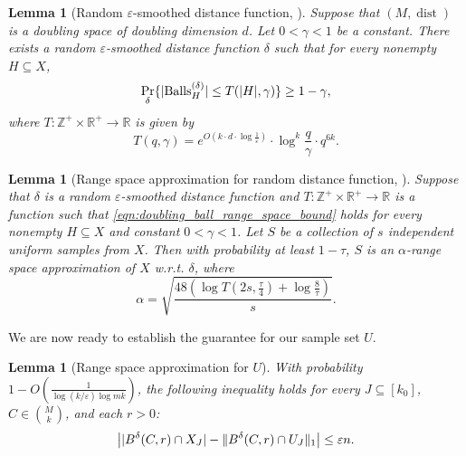 \documentclass[11pt,letterpaper]{article}
\newtheorem{lemma}[theorem]{Lemma}
\theoremstyle{definition}
\newcommand{\eps}{\varepsilon}
\newcommand{\R}{\mathbb{R}}
\newcommand{\Z}{\mathbb{Z}}
\DeclareMathOperator{\dist}{dist}
\DeclarePairedDelimiter{\abs}{\lvert}{\rvert}
\DeclarePairedDelimiter{\norm}{\lVert}{\rVert}
\begin{document}
\begin{lemma}[Random $\eps$-smoothed distance function, {\cite[Eq.(10)]{huang2018epsilon}}] \label{lemma:randomdist}
    Suppose that $(M,\dist)$ is a doubling space of doubling dimension $d$. Let $0<\gamma<1$ be a constant. There exists a random $\eps$-smoothed distance function $\delta$ such that for every nonempty $H\subseteq X$, 
    \begin{equation}\label{eqn:doubling_ball_range_space_bound}
        \Pr_\delta \{ \abs{\Ballsh[\delta]}\leq T(\abs{H},\gamma) \}\geq 1-\gamma,
    \end{equation}
    where $T:\Z^+\times \R^+ \rightarrow \mathbb{R}$ is given by
    \begin{equation}\label{eqn:doubling_T}
       T(q,\gamma) = e^{O(k\cdot d\cdot \log\frac{1}{\eps})}\cdot \log^k{\frac{q}{\gamma}}\cdot q^{6k}.
    \end{equation}
\end{lemma}

\begin{lemma} [Range space approximation for random distance function, {\cite[Lemma 3.1]{huang2018epsilon}}] \label{lemma:randomapprox}
    Suppose that $\delta$ is a random $\eps$-smoothed distance function and $T:\Z^+ \times \R^+\to \R$ is a function such that \eqref{eqn:doubling_ball_range_space_bound} holds 
    for every nonempty $H\subseteq X$ and constant $0<\gamma<1$.
    Let $S$ be a collection of $s$ independent uniform samples from $X$. Then with probability at least $1-\tau$, $S$ is an $\alpha$-range space approximation of $X$ w.r.t. $\delta$, where
    \begin{equation}\label{eqn:doubling_range_space_alpha}
        \alpha = \sqrt{\frac{48( \log{T(2s,\frac{\tau}{4})} +\log{\frac{8}{\tau}})}{s}}.
    \end{equation}
\end{lemma}

We are now ready to establish the guarantee for our sample set $U$.
\begin{lemma} [Range space approximation for $U$]
\label{lemma:eps_range}
    With probability $1 - O(\frac{1}{\log(k/\eps)\log{mk}})$, the following inequality holds for every $J\subseteq [k_0]$, $C\in \binom{M}{k}$, and each $r>0$:
    \[
    \abs[\big]{\abs{ B^\delta(C,r)\cap X_J } - \norm{B^\delta(C,r)\cap  U_{J}}_1 } \leq \eps n.
    \]
\end{lemma}
\end{document}
